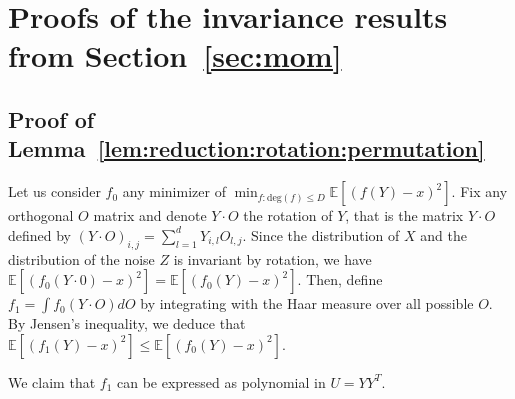 \documentclass{article}
\begin{document}
\printbibliography
\appendix

\section{Proofs of the invariance results from Section~\ref{sec:mom}}



\subsection{Proof of Lemma~\ref{lem:reduction:rotation:permutation}}

Let us consider $f_0$ any minimizer of $\min_{f: \mathrm{deg}(f)\leq D}\mathbb{E}[(f(Y)-x)^2]$. Fix any orthogonal $O$ matrix and denote $Y\cdot O$ the rotation of $Y$, that is the matrix $Y\cdot O$ defined by $(Y\cdot O)_{i,j}= \sum_{l=1}^{d} Y_{i,l}O_{l,j}$. Since the distribution of $X$ and the distribution of the noise $Z$ is invariant by rotation, we have $\mathbb{E}[(f_0(Y\cdot 0)-x)^2]= \mathbb{E}[(f_0(Y)-x)^2]$. Then, define $f_1= \int f_0(Y\cdot O)dO$ by integrating with the Haar measure over all possible $O$. By Jensen's inequality, we deduce that $\mathbb{E}[(f_1(Y)-x)^2]\leq \mathbb{E}[(f_0(Y)-x)^2]$. 

We claim that $f_1$ can be expressed as polynomial in $U=YY^T$. 
\end{document}
